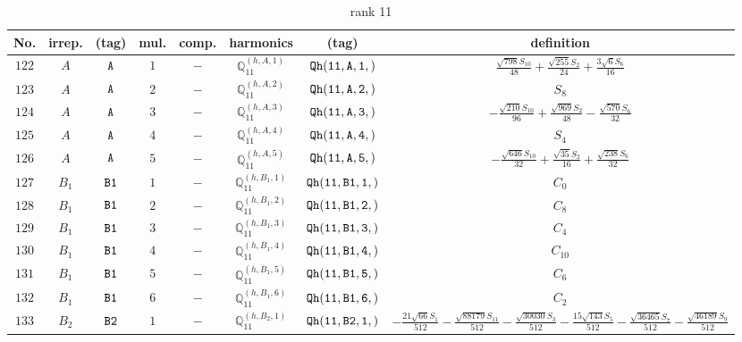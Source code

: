 \documentclass[fleqn,8pt]{jsarticle}
\begin{document}
\begin{table}[ht!]
\begin{center}
\caption{rank 11}
\renewcommand{\arraystretch}{1.3}
\begin{tabular}{cccccccc} \hline \hline
No. & irrep. & (tag) & mul. & comp. & harmonics & (tag) & definition \\ \hline
$ 122 $ & $ A $ & $ {\tt A} $ & $ 1 $ & $ - $ & $ \mathbb{Q}_{11}^{(h,A,1)} $ & $ {\tt Qh(11,A,1,)} $ & $ \frac{\sqrt{798} S_{10}}{48} + \frac{\sqrt{255} S_{2}}{24} + \frac{3 \sqrt{6} S_{6}}{16} $ \\
$ 123 $ & $ A $ & $ {\tt A} $ & $ 2 $ & $ - $ & $ \mathbb{Q}_{11}^{(h,A,2)} $ & $ {\tt Qh(11,A,2,)} $ & $ S_{8} $ \\
$ 124 $ & $ A $ & $ {\tt A} $ & $ 3 $ & $ - $ & $ \mathbb{Q}_{11}^{(h,A,3)} $ & $ {\tt Qh(11,A,3,)} $ & $ - \frac{\sqrt{210} S_{10}}{96} + \frac{\sqrt{969} S_{2}}{48} - \frac{\sqrt{570} S_{6}}{32} $ \\
$ 125 $ & $ A $ & $ {\tt A} $ & $ 4 $ & $ - $ & $ \mathbb{Q}_{11}^{(h,A,4)} $ & $ {\tt Qh(11,A,4,)} $ & $ S_{4} $ \\
$ 126 $ & $ A $ & $ {\tt A} $ & $ 5 $ & $ - $ & $ \mathbb{Q}_{11}^{(h,A,5)} $ & $ {\tt Qh(11,A,5,)} $ & $ - \frac{\sqrt{646} S_{10}}{32} + \frac{\sqrt{35} S_{2}}{16} + \frac{\sqrt{238} S_{6}}{32} $ \\
$ 127 $ & $ B_{1} $ & $ {\tt B1} $ & $ 1 $ & $ - $ & $ \mathbb{Q}_{11}^{(h,B_{1},1)} $ & $ {\tt Qh(11,B1,1,)} $ & $ C_{0} $ \\
$ 128 $ & $ B_{1} $ & $ {\tt B1} $ & $ 2 $ & $ - $ & $ \mathbb{Q}_{11}^{(h,B_{1},2)} $ & $ {\tt Qh(11,B1,2,)} $ & $ C_{8} $ \\
$ 129 $ & $ B_{1} $ & $ {\tt B1} $ & $ 3 $ & $ - $ & $ \mathbb{Q}_{11}^{(h,B_{1},3)} $ & $ {\tt Qh(11,B1,3,)} $ & $ C_{4} $ \\
$ 130 $ & $ B_{1} $ & $ {\tt B1} $ & $ 4 $ & $ - $ & $ \mathbb{Q}_{11}^{(h,B_{1},4)} $ & $ {\tt Qh(11,B1,4,)} $ & $ C_{10} $ \\
$ 131 $ & $ B_{1} $ & $ {\tt B1} $ & $ 5 $ & $ - $ & $ \mathbb{Q}_{11}^{(h,B_{1},5)} $ & $ {\tt Qh(11,B1,5,)} $ & $ C_{6} $ \\
$ 132 $ & $ B_{1} $ & $ {\tt B1} $ & $ 6 $ & $ - $ & $ \mathbb{Q}_{11}^{(h,B_{1},6)} $ & $ {\tt Qh(11,B1,6,)} $ & $ C_{2} $ \\
$ 133 $ & $ B_{2} $ & $ {\tt B2} $ & $ 1 $ & $ - $ & $ \mathbb{Q}_{11}^{(h,B_{2},1)} $ & $ {\tt Qh(11,B2,1,)} $ & $ - \frac{21 \sqrt{66} S_{1}}{512} - \frac{\sqrt{88179} S_{11}}{512} - \frac{\sqrt{30030} S_{3}}{512} - \frac{15 \sqrt{143} S_{5}}{512} - \frac{\sqrt{36465} S_{7}}{512} - \frac{\sqrt{46189} S_{9}}{512} $ \\

\end{tabular}
\end{center}
\end{table}
\end{document}
